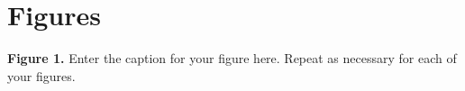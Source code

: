 \documentclass{frontiersSCNS} %
\begin{document}
\section*{Figures}




 \textbf{Figure 1.}{ Enter the caption for your figure here.  Repeat as  necessary for each of your figures.}\label{fig:01}%


\end{document}
